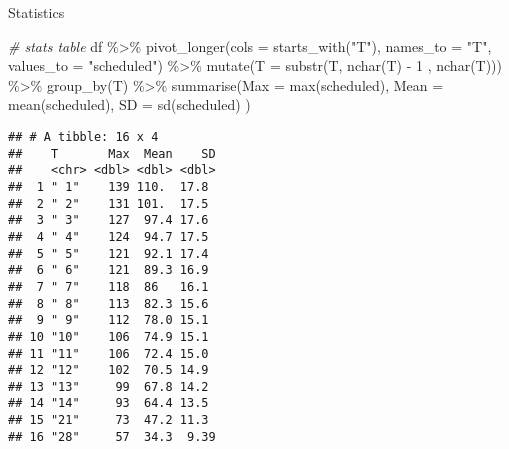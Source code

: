 \documentclass[
  ignorenonframetext,
]{beamer}
\newenvironment{Shaded}{\begin{snugshade}}{\end{snugshade}}
\newcommand{\AttributeTok}[1]{\textcolor[rgb]{0.77,0.63,0.00}{#1}}
\newcommand{\CommentTok}[1]{\textcolor[rgb]{0.56,0.35,0.01}{\textit{#1}}}
\newcommand{\DecValTok}[1]{\textcolor[rgb]{0.00,0.00,0.81}{#1}}
\newcommand{\FunctionTok}[1]{\textcolor[rgb]{0.00,0.00,0.00}{#1}}
\newcommand{\NormalTok}[1]{#1}
\newcommand{\SpecialCharTok}[1]{\textcolor[rgb]{0.00,0.00,0.00}{#1}}
\newcommand{\StringTok}[1]{\textcolor[rgb]{0.31,0.60,0.02}{#1}}
\begin{document}
\begin{frame}[fragile]{Statistics}
\protect\hypertarget{statistics}{}
\begin{Shaded}
\begin{Highlighting}[]
\CommentTok{\# stats table}
\NormalTok{df }\SpecialCharTok{\%\textgreater{}\%} 
  \FunctionTok{pivot\_longer}\NormalTok{(}\AttributeTok{cols =} \FunctionTok{starts\_with}\NormalTok{(}\StringTok{"T"}\NormalTok{), }\AttributeTok{names\_to =} \StringTok{"T"}\NormalTok{, }\AttributeTok{values\_to =} \StringTok{"scheduled"}\NormalTok{) }\SpecialCharTok{\%\textgreater{}\%} 
  \FunctionTok{mutate}\NormalTok{(}\AttributeTok{T =} \FunctionTok{substr}\NormalTok{(T, }\FunctionTok{nchar}\NormalTok{(T) }\SpecialCharTok{{-}} \DecValTok{1}\NormalTok{ , }\FunctionTok{nchar}\NormalTok{(T))) }\SpecialCharTok{\%\textgreater{}\%} 
  \FunctionTok{group\_by}\NormalTok{(T) }\SpecialCharTok{\%\textgreater{}\%} 
  \FunctionTok{summarise}\NormalTok{(}\AttributeTok{Max =} \FunctionTok{max}\NormalTok{(scheduled),}
            \AttributeTok{Mean =} \FunctionTok{mean}\NormalTok{(scheduled),}
            \AttributeTok{SD =} \FunctionTok{sd}\NormalTok{(scheduled)}
\NormalTok{            )}
\end{Highlighting}
\end{Shaded}

\begin{verbatim}
## # A tibble: 16 x 4
##    T       Max  Mean    SD
##    <chr> <dbl> <dbl> <dbl>
##  1 " 1"    139 110.  17.8 
##  2 " 2"    131 101.  17.5 
##  3 " 3"    127  97.4 17.6 
##  4 " 4"    124  94.7 17.5 
##  5 " 5"    121  92.1 17.4 
##  6 " 6"    121  89.3 16.9 
##  7 " 7"    118  86   16.1 
##  8 " 8"    113  82.3 15.6 
##  9 " 9"    112  78.0 15.1 
## 10 "10"    106  74.9 15.1 
## 11 "11"    106  72.4 15.0 
## 12 "12"    102  70.5 14.9 
## 13 "13"     99  67.8 14.2 
## 14 "14"     93  64.4 13.5 
## 15 "21"     73  47.2 11.3 
## 16 "28"     57  34.3  9.39
\end{verbatim}
\end{frame}
\end{document}
